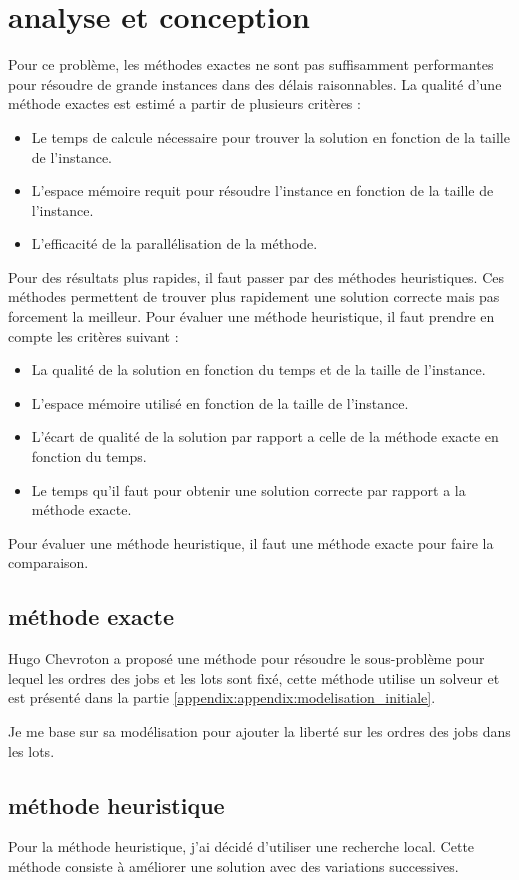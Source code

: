 \chapter{analyse et conception}

Pour ce problème, les méthodes exactes ne sont pas suffisamment performantes pour résoudre de grande instances dans des délais raisonnables.
La qualité d'une méthode exactes est estimé a partir de plusieurs critères :
\begin{itemize}
	\item Le temps de calcule nécessaire pour trouver la solution en fonction de la taille de l'instance.
	\item L'espace mémoire requit pour résoudre l'instance en fonction de la taille de l'instance.
	\item L'efficacité de la parallélisation de la méthode.
\end{itemize}
Pour des résultats plus rapides, il faut passer par des méthodes heuristiques.
Ces méthodes permettent de trouver plus rapidement une solution correcte mais pas forcement la meilleur.
Pour évaluer une méthode heuristique, il faut prendre en compte les critères suivant :
\begin{itemize}
	\item La qualité de la solution en fonction du temps et de la taille de l'instance.
	\item L'espace mémoire utilisé en fonction de la taille de l'instance.
	\item L'écart de qualité de la solution par rapport a celle de la méthode exacte en fonction du temps.
	\item Le temps qu'il faut pour obtenir une solution correcte par rapport a la méthode exacte.
\end{itemize}
Pour évaluer une méthode heuristique, il faut une méthode exacte pour faire la comparaison.

\section{méthode exacte}
Hugo Chevroton a proposé une méthode pour résoudre le sous-problème pour lequel les ordres des jobs et les lots sont fixé,
cette méthode utilise un solveur et est présenté dans la partie \autoref{appendix:appendix:modelisation_initiale}.

Je me base sur sa modélisation pour ajouter la liberté sur les ordres des jobs dans les lots.



\section{méthode heuristique}

Pour la méthode heuristique, j'ai décidé d'utiliser une recherche local.
Cette méthode consiste à améliorer une solution avec des variations successives.